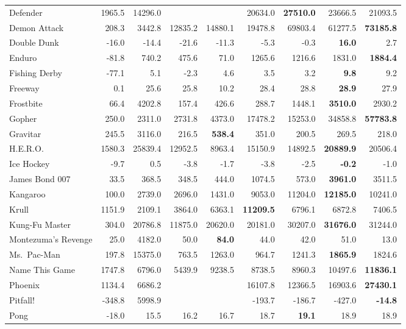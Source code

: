 \documentclass[a4paper]{article}
\begin{document}
\begin{table}[p]
{{\begin{tabular}{|l|rr|rrr|rrr|}
Defender  & 1965.5 & 14296.0 &  &  & 20634.0 & \textbf{27510.0} & 23666.5 & 21093.5\\
Demon Attack  & 208.3 & 3442.8 & 12835.2 & 14880.1 & 19478.8 & 69803.4 & 61277.5 & \textbf{73185.8}\\
Double Dunk  & -16.0 & -14.4 & -21.6 & -11.3 & -5.3 & -0.3 & \textbf{16.0} & 2.7\\
Enduro  & -81.8 & 740.2 & 475.6 & 71.0 & 1265.6 & 1216.6 & 1831.0 & \textbf{1884.4}\\
Fishing Derby  & -77.1 & 5.1 & -2.3 & 4.6 & 3.5 & 3.2 & \textbf{9.8} & 9.2\\
Freeway  & 0.1 & 25.6 & 25.8 & 10.2 & 28.4 & 28.8 & \textbf{28.9} & 27.9\\
Frostbite  & 66.4 & 4202.8 & 157.4 & 426.6 & 288.7 & 1448.1 & \textbf{3510.0} & 2930.2\\
Gopher  & 250.0 & 2311.0 & 2731.8 & 4373.0 & 17478.2 & 15253.0 & 34858.8 & \textbf{57783.8}\\
Gravitar  & 245.5 & 3116.0 & 216.5 & \textbf{538.4} & 351.0 & 200.5 & 269.5 & 218.0\\
H.E.R.O.  & 1580.3 & 25839.4 & 12952.5 & 8963.4 & 15150.9 & 14892.5 & \textbf{20889.9} & 20506.4\\
Ice Hockey  & -9.7 & 0.5 & -3.8 & -1.7 & -3.8 & -2.5 & \textbf{-0.2} & -1.0\\
James Bond 007  & 33.5 & 368.5 & 348.5 & 444.0 & 1074.5 & 573.0 & \textbf{3961.0} & 3511.5\\
Kangaroo  & 100.0 & 2739.0 & 2696.0 & 1431.0 & 9053.0 & 11204.0 & \textbf{12185.0} & 10241.0\\
Krull  & 1151.9 & 2109.1 & 3864.0 & 6363.1 & \textbf{11209.5} & 6796.1 & 6872.8 & 7406.5\\
Kung-Fu Master  & 304.0 & 20786.8 & 11875.0 & 20620.0 & 20181.0 & 30207.0 & \textbf{31676.0} & 31244.0\\
Montezuma's Revenge  & 25.0 & 4182.0 & 50.0 & \textbf{84.0} & 44.0 & 42.0 & 51.0 & 13.0\\
Ms.\ Pac-Man  & 197.8 & 15375.0 & 763.5 & 1263.0 & 964.7 & 1241.3 & \textbf{1865.9} & 1824.6\\
Name This Game  & 1747.8 & 6796.0 & 5439.9 & 9238.5 & 8738.5 & 8960.3 & 10497.6 & \textbf{11836.1}\\
Phoenix  & 1134.4 & 6686.2 &  &  & 16107.8 & 12366.5 & 16903.6 & \textbf{27430.1}\\
Pitfall!  & -348.8 & 5998.9 &  &  & -193.7 & -186.7 & -427.0 & \textbf{-14.8}\\
Pong  & -18.0 & 15.5 & 16.2 & 16.7 & 18.7 & \textbf{19.1} & 18.9 & 18.9\\

\end{tabular}}}
\end{table}
\end{document}
